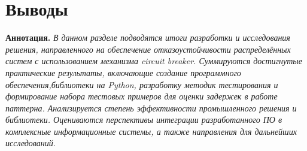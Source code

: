 \section{Выводы}
\textbf{Аннотация. } \textit{В данном разделе подводятся итоги разработки и исследования решения, направленного на обеспечение отказоустойчивости распределённых систем с использованием механизма circuit breaker. Суммируются достигнутые практические результаты, включающие создание программного обеспечения,библиотеки на Python, разработку методик тестирования и формирование набора тестовых примеров для оценки задержек в работе паттерна. Анализируется степень эффективности промышленного решения и библиотеки. Оцениваются перспективы интеграции разработанного ПО в комплексные информационные системы, а также направления для дальнейших исследований.}


